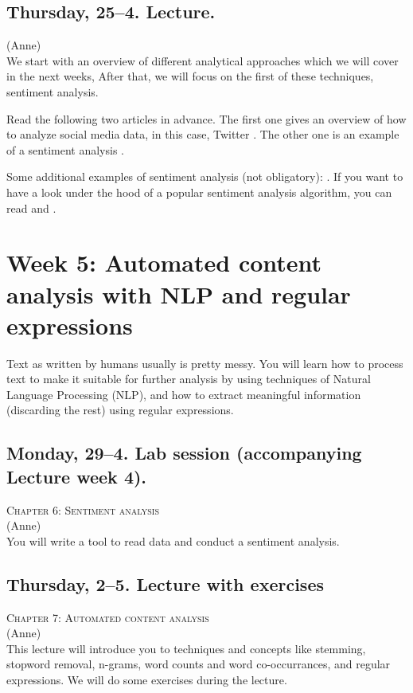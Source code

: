 \documentclass[a4paper,10pt]{report}
\begin{document}
\subsection*{Thursday, 25--4. Lecture.}
{\footnotesize{(Anne)}\\}
We start with an overview of different analytical approaches which we will cover in the next weeks, After that, we will focus on the first of these techniques, sentiment analysis.

Read the following two articles in advance. The first one gives an overview of how to analyze social media data, in this case, Twitter \citep{Bruns2013}. The other one is an example of a sentiment analysis \citep{Mostafa2013}.

Some additional examples of sentiment analysis (not obligatory): \cite{Huang2007,Pestian2012}. If you want to have a look under the hood of a popular sentiment analysis algorithm, you can read \cite{Thelwall2012} and \cite{Hutto2014}.



\section*{Week 5: Automated content analysis with NLP and regular expressions}
Text as written by humans usually is pretty messy. You will learn how to process text to make it suitable for further analysis by using techniques of Natural Language Processing (NLP), and how to extract meaningful information (discarding the rest) using regular expressions.



\subsection*{Monday, 29--4. Lab session (accompanying Lecture week 4).}
\textsc{ Chapter 6: Sentiment analysis}\\
{\footnotesize{(Anne)}\\}
You will write a tool to read data and conduct a sentiment analysis.

\subsection*{Thursday, 2--5. Lecture with exercises}
\textsc{ Chapter 7: Automated content analysis}\\
{\footnotesize{(Anne)}\\}
This lecture will introduce you to techniques and concepts like stemming, stopword removal, n-grams, word counts and word co-occurrances, and regular expressions. We will do some exercises during the lecture.
\end{document}
